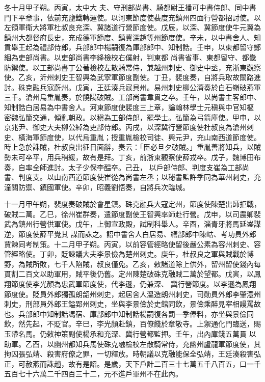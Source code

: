 \begin{pinyinscope}
 冬十月甲子朔。丙寅，太中大
 夫、守刑部尚書、騎都尉王播可中書侍郎、同中書門下平章事，依前充鹽鐵轉運使。以河東節度使裴度充鎮州四面行營都招討使。以左領軍衛大將軍杜叔良充深、冀諸道行營節度使。戊辰，以深、冀節度使牛元翼為鎮州大都督府長史，充成德軍節度、鎮冀深趙等州節度使。辛未，以中書舍人、知貢舉王起為禮部侍郎，兵部郎中楊嗣復為庫部郎中、知制誥。壬申，以東都留守鄭絪為吏部尚書。以吏部尚書李絳檢校右僕射，判東都
 尚書省事、東都留守、都畿防禦使。以工部尚書丁公著檢校左散騎常侍，兼越州刺史、御史中丞，充浙東觀察使。乙亥，沂州刺史王智興為武寧軍節度副使。丁丑，裴度奏，自將兵取故關路進討。硃克融兵寇蔚州。戊寅，王廷湊兵寇貝州。易州刺史柳公濟奏於白石嶺破燕軍三千。滄州烏重胤奏，於饒陽破賊。工部尚書韋貫之卒。壬午，以尚書主客郎中、知制誥白居易為中書舍人。河東節度使裴度三上章，論翰林學士元稹與中官知樞
 密魏弘簡交通，傾亂朝政。以稹為工部侍郎，罷學士。弘簡為弓箭庫使。甲申，以京兆尹、御史大夫柳公綽為吏部侍郎。丙戌，以深冀行營節度使杜叔良為滄州刺史、橫海軍節度使，以代烏重胤；授重胤檢校司徒、興元尹，充山南西道節度使。時上急於誅賊，杜叔良出征日面辭，奏云：「臣必旦夕破賊。」重胤善將知兵，以賊勢未可卒平，用兵稍緩，故有是拜。丁亥，前浙東觀察使薛戎卒。戊子，魏博田布奏，自率全師進討。太子少保李醖卒。己丑，
 以戶部侍郎、判度支崔為工部尚書、判度支。以山南西道節度使崔從為尚書左丞；以秘書監許季同為華州刺史，充潼關防禦、鎮國軍使。辛卯，昭義劉悟奏，自將兵次臨城。



 十一月甲午朔，裴度奏破賊於會星鎮。硃克融兵大寇定州，節度使陳楚出師拒戰，破賊二萬。乙巳，徐州崔群奏，遣節度副使王智興率師赴行營。戊申，以司農卿裴武為鎮州行營供軍使。戊午，上御宣政殿，試制科舉人。辛酉，淄青牙將馬延崟謀逆，節度使薛平覺其
 謀而誅之。詔中書舍人白居易、繕部郎中陳岵、考功員外郎賈餗同考制策。十二月甲子朔。丙寅，以前容管經略使留後嚴公素為容州刺史、容管經略使。丁卯，貶諫議大夫李景儉為楚州刺史。庚午，杜叔良之軍與賊戰於博野，為賊所敗，七千人陷賊，叔良僅免。乙亥，敕諸道除上供外，留州留使錢內每貫割二百文以助軍用，賊平後仍舊。定州陳楚破硃克融賊二萬於望都。戊寅，以鳳翔節度使李光顏為忠武軍節度使，代李遜，仍兼深、
 冀行營節度。以李遜為鳳翔節度使。貶員外郎獨孤朗韶州刺史，起居舍人溫造朗州刺史，司勛員外郎李肇澧州刺史，刑部員外郎王鎰郢州刺史，坐與李景儉於史館同飲，景儉乘醉見宰相謾罵故也。兵部郎中知制誥馮宿、庫部郎中知制誥楊嗣復各罰一季俸料，亦坐與景儉同飲，然先起，不貶官。辛巳，李光顏赴鎮，百僚餞於章敬寺。上禦通化門臨送，賜玉帶名馬。仍敕神策副使楊承和充深、冀行營都監押。壬午，出內庫錢五萬貫
 以助軍。乙酉，以幽州都知兵馬使硃克融檢校左散騎常侍，充幽州盧龍軍節度使，其拘囚張弘靖、殺害府僚之罪，一切釋放。時朝議以克融能保全弘靖，王廷湊殺害弘正，可赦燕而誅趙，故有是詔。是歲，天下戶計二百三十七萬五千八百五，口一千五百七十六萬二千四百三十二，元不進戶軍州不在此內。




\end{pinyinscope}
